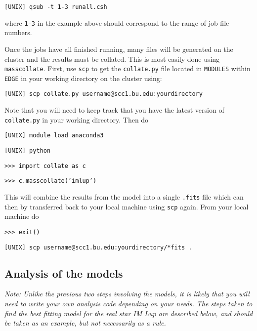 \documentclass{article}
\begin{document}
\vspace{2mm}
\texttt{[UNIX] qsub -t 1-3 runall.csh}
\vspace{2mm}

where \texttt{1-3} in the example above should correspond to the range of job file numbers.

Once the jobs have all finished running, many files will be generated on the cluster and the results must be collated. This is most easily done using \texttt{masscollate}. First, use \texttt{scp} to get the \texttt{collate.py} file located in \texttt{MODULES} within \texttt{EDGE} in your working directory on the cluster using:

\vspace{2mm}
\texttt{[UNIX] scp collate.py username@scc1.bu.edu:yourdirectory}
\vspace{2mm}

\noindent Note that you will need to keep track that you have the latest version of \texttt{collate.py} in your working directory.  Then do

\vspace{2mm}
\texttt{[UNIX] module load anaconda3}
\vspace{2mm}

\vspace{2mm}
\texttt{[UNIX] python} 
\vspace{2mm}

\vspace{2mm}
\texttt{>>> import collate as c}

\texttt{>>> c.masscollate('imlup')}
\vspace{2mm}

\noindent This will combine the results from the model into a single  \texttt{.fits} file which can then by transferred back to your local machine using \texttt{scp} again.  From your local machine do

\vspace{2mm}
\texttt{>>> exit()}
\vspace{2mm}

\vspace{2mm}
\texttt{[UNIX] scp username@scc1.bu.edu:yourdirectory/*fits .}
\vspace{2mm}


\subsection{Analysis of the models}

\textit{Note: Unlike the previous two steps involving the models, it is likely that you will need to write your own analysis code depending on your needs. The steps taken to find the best fitting model for the real star IM Lup are described below, and should be taken as an example, but not necessarily as a rule.}
\vspace{2mm}
\end{document}
